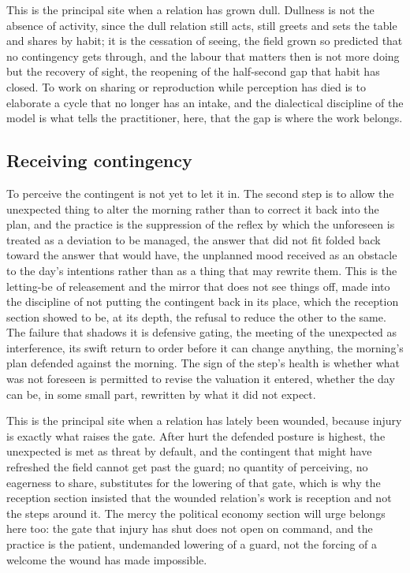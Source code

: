 This is the principal site when a relation has grown dull. Dullness is not the absence of activity, since the dull relation still acts, still greets and sets the table and shares by habit; it is the cessation of seeing, the field grown so predicted that no contingency gets through, and the labour that matters then is not more doing but the recovery of sight, the reopening of the half-second gap that habit has closed. To work on sharing or reproduction while perception has died is to elaborate a cycle that no longer has an intake, and the dialectical discipline of the model is what tells the practitioner, here, that the gap is where the work belongs.

\subsection{Receiving contingency}
\label{p22:sub:we-receiving}

To perceive the contingent is not yet to let it in. The second step is to allow the unexpected thing to alter the morning rather than to correct it back into the plan, and the practice is the suppression of the reflex by which the unforeseen is treated as a deviation to be managed, the answer that did not fit folded back toward the answer that would have, the unplanned mood received as an obstacle to the day's intentions rather than as a thing that may rewrite them. This is the letting-be of releasement and the mirror that does not see things off, made into the discipline of not putting the contingent back in its place, which the reception section showed to be, at its depth, the refusal to reduce the other to the same. The failure that shadows it is defensive gating, the meeting of the unexpected as interference, its swift return to order before it can change anything, the morning's plan defended against the morning. The sign of the step's health is whether what was not foreseen is permitted to revise the valuation it entered, whether the day can be, in some small part, rewritten by what it did not expect.

This is the principal site when a relation has lately been wounded, because injury is exactly what raises the gate. After hurt the defended posture is highest, the unexpected is met as threat by default, and the contingent that might have refreshed the field cannot get past the guard; no quantity of perceiving, no eagerness to share, substitutes for the lowering of that gate, which is why the reception section insisted that the wounded relation's work is reception and not the steps around it. The mercy the political economy section will urge belongs here too: the gate that injury has shut does not open on command, and the practice is the patient, undemanded lowering of a guard, not the forcing of a welcome the wound has made impossible.

